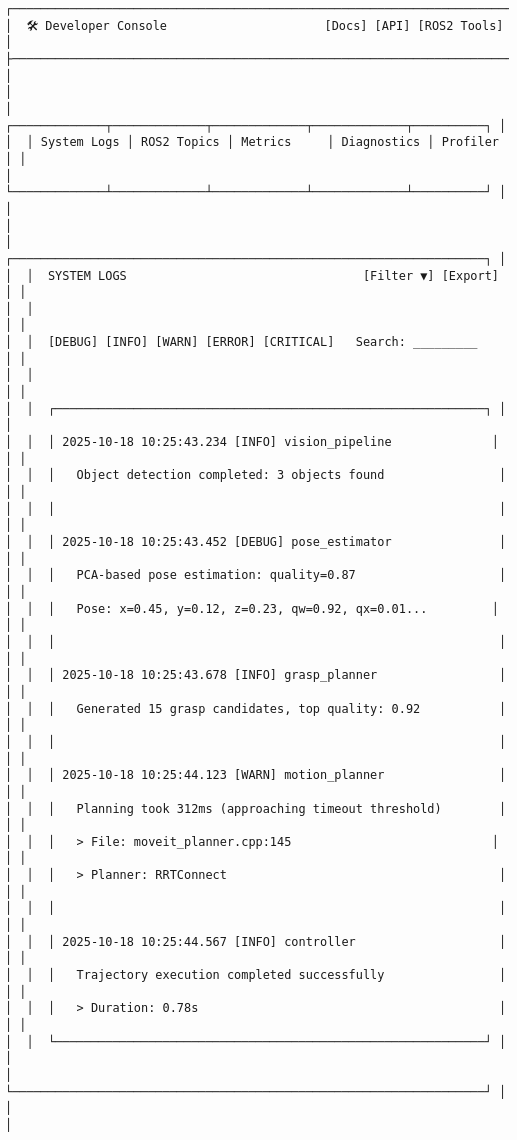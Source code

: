 \documentclass[
]{article}
\begin{document}
\begin{verbatim}
┌────────────────────────────────────────────────────────────────────────┐
│  🛠 Developer Console                      [Docs] [API] [ROS2 Tools]   │
├────────────────────────────────────────────────────────────────────────┤
│                                                                        │
│  ┌─────────────┬─────────────┬─────────────┬─────────────┬──────────┐ │
│  │ System Logs │ ROS2 Topics │ Metrics     │ Diagnostics │ Profiler │ │
│  └─────────────┴─────────────┴─────────────┴─────────────┴──────────┘ │
│                                                                        │
│  ┌──────────────────────────────────────────────────────────────────┐ │
│  │  SYSTEM LOGS                                 [Filter ▼] [Export] │ │
│  │                                                                   │ │
│  │  [DEBUG] [INFO] [WARN] [ERROR] [CRITICAL]   Search: _________    │ │
│  │                                                                   │ │
│  │  ┌────────────────────────────────────────────────────────────┐ │ │
│  │  │ 2025-10-18 10:25:43.234 [INFO] vision_pipeline              │ │ │
│  │  │   Object detection completed: 3 objects found                │ │ │
│  │  │                                                              │ │ │
│  │  │ 2025-10-18 10:25:43.452 [DEBUG] pose_estimator               │ │ │
│  │  │   PCA-based pose estimation: quality=0.87                    │ │ │
│  │  │   Pose: x=0.45, y=0.12, z=0.23, qw=0.92, qx=0.01...         │ │ │
│  │  │                                                              │ │ │
│  │  │ 2025-10-18 10:25:43.678 [INFO] grasp_planner                 │ │ │
│  │  │   Generated 15 grasp candidates, top quality: 0.92           │ │ │
│  │  │                                                              │ │ │
│  │  │ 2025-10-18 10:25:44.123 [WARN] motion_planner                │ │ │
│  │  │   Planning took 312ms (approaching timeout threshold)        │ │ │
│  │  │   > File: moveit_planner.cpp:145                            │ │ │
│  │  │   > Planner: RRTConnect                                      │ │ │
│  │  │                                                              │ │ │
│  │  │ 2025-10-18 10:25:44.567 [INFO] controller                    │ │ │
│  │  │   Trajectory execution completed successfully                │ │ │
│  │  │   > Duration: 0.78s                                          │ │ │
│  │  └────────────────────────────────────────────────────────────┘ │ │
│  └──────────────────────────────────────────────────────────────────┘ │
│                                                                        │

\end{verbatim}
\end{document}
